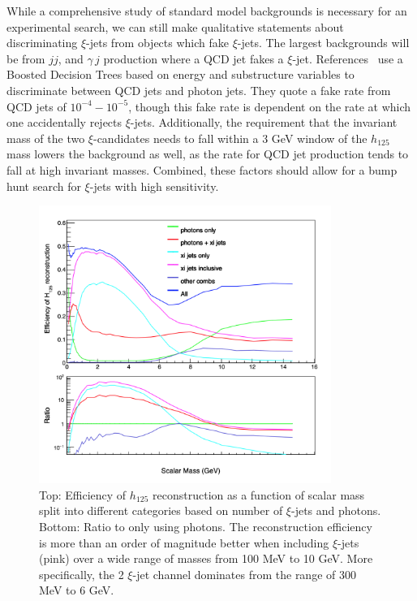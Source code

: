 \documentclass[letter,12pt]{article}
\begin{document}
While a comprehensive study of standard model backgrounds is necessary for an experimental search, we can still make qualitative statements about discriminating $\xi$-jets from objects which fake $\xi$-jets. The largest backgrounds will be from $jj$, and $\gamma\, j$ production where a QCD jet fakes a $\xi$-jet. References~\cite{chakraborty_framework_2018,photon_jets} use a Boosted Decision Trees based on energy and substructure variables to discriminate between QCD jets and photon jets. They quote a fake rate from QCD jets of $10^{-4} - 10^{-5}$, though this fake rate is dependent on the rate at which one accidentally rejects $\xi$-jets. Additionally, the requirement that the invariant mass of the two $\xi$-candidates needs to fall within a 3 GeV window of the $h_{125}$ mass lowers the background as well, as the rate for QCD jet production tends to fall at high invariant masses. Combined, these factors should allow for a bump hunt search for $\xi$-jets with high sensitivity.

\begin{figure}[t!]
\begin{center}
\includegraphics[width=0.85\textwidth]{higgs_reco_eff.png}
\caption{Top: Efficiency of $h_{125}$ reconstruction as a function of scalar mass split into different categories based on number of $\xi$-jets and photons. Bottom: Ratio to only using photons. The reconstruction efficiency is more than an order of magnitude better when including $\xi$-jets (pink) over a wide range of masses from 100 MeV to 10 GeV. More specifically, the 2 $\xi$-jet channel dominates from the range of 300 MeV to 6 GeV.}
\label{fig:higgs_eff}
\end{center}
\end{figure}
\end{document}
